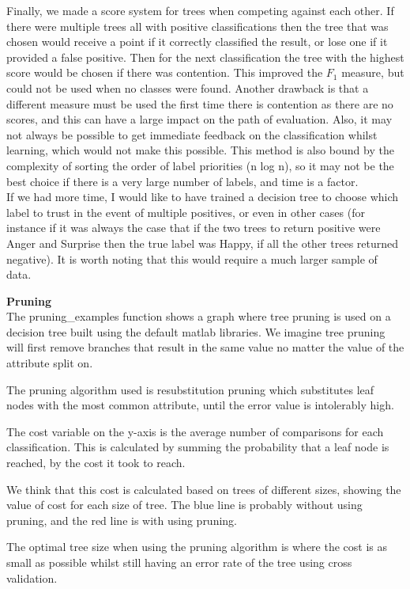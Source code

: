 \documentclass[12pt]{article}
\begin{document}
Finally, we made a score system for trees when competing against each other. If there were multiple trees all with positive classifications then the tree that was chosen would receive a point if it correctly classified the result, or lose one if it provided a false positive. Then for the next classification the tree with the highest score would be chosen if there was contention. This improved the \( F_1 \) measure, but could not be used when no classes were found. Another drawback is that a different measure must be used the first time there is contention as there are no scores, and this can have a large impact on the path of evaluation. Also, it may not always be possible to get immediate feedback on the classification whilst learning, which would not make this possible. This method is also bound by the complexity of sorting the order of label priorities (n log n), so it may not be the best choice if there is a very large number of labels, and time is a factor. \\

If we had more time, I would like to have trained a decision tree to choose which label to trust in the event of multiple positives, or even in other cases (for instance if it was always the case that if the two trees to return positive were Anger and Surprise then the true label was Happy, if all the other trees returned negative). It is worth noting that this would require a much larger sample of data.

{\bf Pruning} \\
The pruning_examples function shows a graph where tree pruning is used on a decision tree built using the default matlab libraries. We imagine tree pruning will first remove branches that result in the same value no matter the value of the attribute split on.

The pruning algorithm used is resubstitution pruning which substitutes leaf nodes with the most common attribute, until the error value is intolerably high.

The cost variable on the y-axis is the average number of comparisons for each classification. This is calculated by summing the probability that a leaf node is reached, by the cost it took to reach.

We think that this cost is calculated based on trees of different sizes, showing the value of cost for each size of tree. The blue line is probably without using pruning, and the red line is with using pruning.

The optimal tree size when using the pruning algorithm is where the cost is as small as possible whilst still having an error rate of the tree using cross validation.
\end{document}
